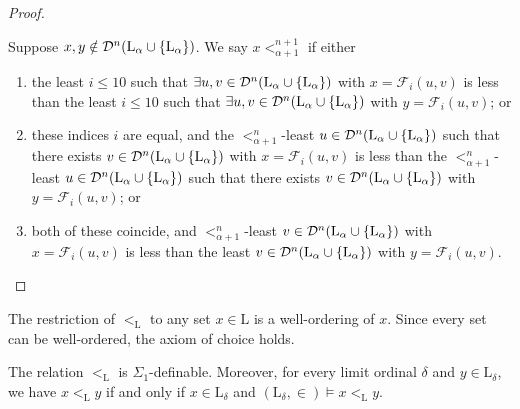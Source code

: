 \begin{proof}
\begin{enumerate}
        Suppose \( x, y \notin \mathcal D^n(\mathrm{L}_\alpha \cup \qty{\mathrm{L}_\alpha}) \).
        We say \( x <_{\alpha + 1}^{n+1} \) if either
        \begin{enumerate}
            \item the least \( i \leq 10 \) such that \( \exists u, v \in \mathcal D^n(\mathrm{L}_\alpha \cup \qty{\mathrm{L}_\alpha}) \) with \( x = \mathcal F_i(u, v) \) is less than the least \( i \leq 10 \) such that \( \exists u, v \in \mathcal D^n(\mathrm{L}_\alpha \cup \qty{\mathrm{L}_\alpha}) \) with \( y = \mathcal F_i(u, v) \); or
            \item these indices \( i \) are equal, and the \( <_{\alpha + 1}^n \)-least \( u \in \mathcal D^n(\mathrm{L}_\alpha \cup \qty{\mathrm{L}_\alpha}) \) such that there exists \( v \in \mathcal D^n(\mathrm{L}_\alpha \cup \qty{\mathrm{L}_\alpha}) \) with \( x = \mathcal F_i(u, v) \) is less than the \( <_{\alpha + 1}^n \)-least \( u \in \mathcal D^n(\mathrm{L}_\alpha \cup \qty{\mathrm{L}_\alpha}) \) such that there exists \( v \in \mathcal D^n(\mathrm{L}_\alpha \cup \qty{\mathrm{L}_\alpha}) \) with \( y = \mathcal F_i(u, v) \); or
            \item both of these coincide, and \( <_{\alpha + 1}^n \)-least \( v \in \mathcal D^n(\mathrm{L}_\alpha \cup \qty{\mathrm{L}_\alpha}) \) with \( x = \mathcal F_i(u, v) \) is less than the least \( v \in \mathcal D^n(\mathrm{L}_\alpha \cup \qty{\mathrm{L}_\alpha}) \) with \( y = \mathcal F_i(u, v) \).
        \end{enumerate}
    \end{enumerate}
\end{proof}
The restriction of \( <_{\mathrm{L}} \) to any set \( x \in \mathrm{L} \) is a well-ordering of \( x \).
Since every set can be well-ordered, the axiom of choice holds.
\begin{lemma}
    The relation \( <_{\mathrm{L}} \) is \( \Sigma_1 \)-definable.
    Moreover, for every limit ordinal \( \delta \) and \( y \in \mathrm{L}_\delta \), we have \( x <_{\mathrm{L}} y \) if and only if \( x \in \mathrm{L}_\delta \) and \( (\mathrm{L}_\delta, \in) \vDash x <_{\mathrm{L}} y \).
\end{lemma}


